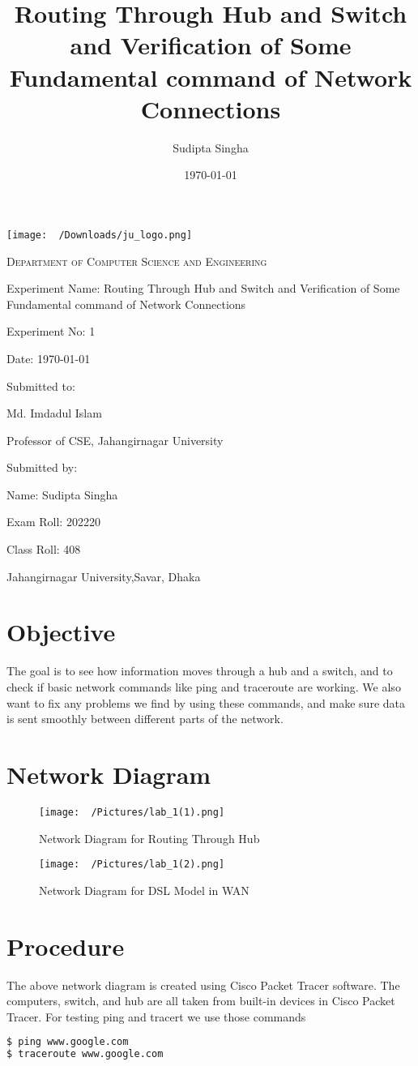 \documentclass{article}
\title{Routing Through Hub and Switch and Verification of Some Fundamental command of Network Connections}
\author{Sudipta Singha}
\date{\today}
\newcommand{\frontpage}[6]{%
    \begin{titlepage}
        \centering
        \texttt{[image: ~/Downloads/ju\_logo.png]}\par\vspace{1cm}
        \vspace{1cm}
        {\scshape\Large Department of Computer Science and Engineering\par}
        \vspace{1.5cm}
        \vspace{0.5cm}
        {\Large Experiment Name: #4\par}
        \vspace{0.5cm}
        {\Large Experiment No: #5\par}
        \vspace{0.5cm}
        {\Large Date: #6\par}
        \vfill
        Submitted to:\par
        Md. Imdadul Islam\par
        Professor of CSE, Jahangirnagar University\par
        \vspace{0.5cm}
        Submitted by:\par
        Name: #1\par
        Exam Roll: #2\par
        Class Roll: #3\par
        \vspace{1cm}
        Jahangirnagar University,Savar, Dhaka\par
        \vfill
    \end{titlepage}
}
\begin{document}
\frontpage{Sudipta Singha}{202220}{408}{Routing Through Hub and Switch and Verification of Some Fundamental command of Network Connections}{1}{\today}


\section{Objective}
The goal is to see how information moves through a hub and a switch, and to check if basic network commands like ping and traceroute are working. We also want to fix any problems we find by using these commands, and make sure data is sent smoothly between different parts of the network.
\section{Network Diagram}
\begin{figure}[H]
    \centering
    \texttt{[image: ~/Pictures/lab\_1(1).png]}
    \caption{Network Diagram for Routing Through Hub}
\end{figure}

\begin{figure}[H]
    \centering
    \texttt{[image: ~/Pictures/lab\_1(2).png]}
    \caption{Network Diagram for DSL Model in WAN}
\end{figure}

\section{Procedure}
The above network diagram is created using Cisco Packet Tracer software. The computers, switch, and hub are all taken from built-in devices in Cisco Packet Tracer.
For testing ping and tracert we use those commands
\begin{lstlisting}[language=bash]
$ ping www.google.com
$ traceroute www.google.com
\end{lstlisting}
\end{document}
